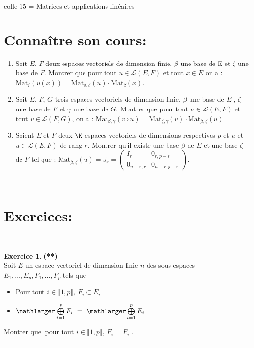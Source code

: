 \documentclass[a4paper,11pt]{article}
\theoremstyle{definition}
\newtheorem{exo}{Exercice} %
\begin{document}
	
	
	\begin{center}
		\Large \sc colle 15 = Matrices et applications linéaires
	\end{center}
\raggedright


\section*{Connaître son cours:}
\begin{enumerate}
\item Soit $E$, $F$ deux espaces vectoriels de dimension finie, $\beta$ une base de E et $\zeta$ une base de $F$. Montrer que pour tout $u \in \mathcal{L} (E , F )$ et tout $x \in E$ on a : $\text{Mat}_\zeta (u (x )) = \text{Mat}_{\beta,\zeta}(u) \cdot \text{Mat}_\beta(x )$.
\item Soit $E $, $F $, $G$ trois espaces vectoriels de dimension finie, $\beta$ une base de $E$ , $\zeta$ une base de $F$ et $\gamma$
une base de $G $. Montrer que pour tout $u \in \mathcal{L} (E , F )$ et tout $v \in \mathcal{L} (F , G )$, on a : $\text{Mat}_{\beta, \gamma} (v\circ u ) = \text{Mat}_{\zeta, \gamma} (v ) \cdot \text{Mat}_{\beta, \zeta} ( u )$
\item Soient $E$ et $F$ deux $\K$-espaces vectoriels de dimensions respectives $p$ et $n$ et $u \in\mathcal L (E, F )$ de rang $r$.  Montrer qu'il existe une base $\beta$ de $E$ et une base $\zeta$ de $F$ tel que : $\text{Mat}_{\beta,\zeta}(u) = J_r = \begin{pmatrix}
I_r & 0_{r,p-r} \\
0_{n-r,r} & 0_{n-r,p-r}
\end{pmatrix}$.

\end{enumerate}
\quad\\[0.2cm]

\section*{Exercices:} 	

\quad\\[0.2cm]
\begin{exo}\textbf{(**)}\quad\\[0.2cm]
	Soit $E$ un espace vectoriel de dimension finie $n$ des sous-espaces $E_1 ,  \dots , E_p , F_1 ,\dots , F_p $ tels que
	\begin{itemize}[$\bullet$]
		\item Pour tout $i \in \llbracket 1, p \rrbracket, \ F_i \subset E_i$
		\item $\mathlarger\bigoplus\limits_{i=1}^p F_i \ = \ \mathlarger\bigoplus\limits_{i=1}^p E_i$
	\end{itemize}

Montrer que, pour tout $i \in \llbracket 1, p \rrbracket, \ F_i = E_i$ .\quad\\[0.2cm]
	
	\centering
	\rule{1\linewidth}{0.6pt}\quad\\[0.2cm]
\end{exo}
\end{document}
